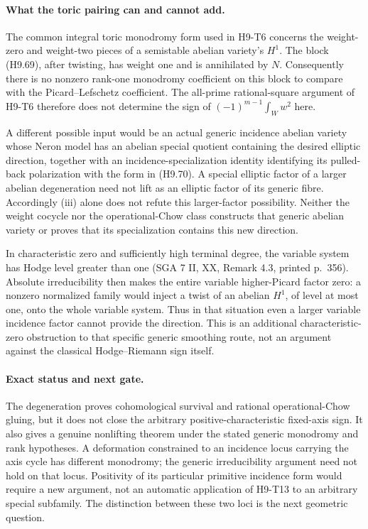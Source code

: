 \documentclass[11pt,a4paper]{article}
\begin{document}
\paragraph{What the toric pairing can and cannot add.}
The common integral toric monodromy form used in H9-T6 concerns the
weight-zero and weight-two pieces of a semistable abelian variety's
$H^1$. The block (H9.69), after twisting, has weight one and is
annihilated by $N$. Consequently there is no nonzero rank-one
monodromy coefficient on this block to compare with the
Picard--Lefschetz coefficient. The all-prime rational-square
argument of H9-T6 therefore does not determine the sign of
$(-1)^{m-1}\int_Ww^2$ here.

A different possible input would be an actual generic incidence
abelian variety whose Neron model has an abelian special quotient
containing the desired elliptic direction, together with an
incidence-specialization identity identifying its pulled-back
polarization with the form in (H9.70). A special elliptic factor of
a larger abelian degeneration need not lift as an elliptic factor
of its generic fibre. Accordingly (iii) alone does not refute this
larger-factor possibility. Neither the weight cocycle nor the
operational-Chow class constructs that generic abelian variety
or proves that its specialization contains this new direction.

In characteristic zero and sufficiently high terminal degree, the
variable system has Hodge level greater than one (SGA 7 II, XX,
Remark 4.3, printed p.~356). Absolute irreducibility then makes
the entire variable higher-Picard factor zero: a nonzero normalized
family would inject a twist of an abelian $H^1$, of level at most
one, onto the whole variable system. Thus in that situation even
a larger variable incidence factor cannot provide the direction.
This is an additional characteristic-zero obstruction to that
specific generic smoothing route, not an argument against the
classical Hodge--Riemann sign itself.

\paragraph{Exact status and next gate.}
The degeneration proves cohomological survival and rational
operational-Chow gluing, but it does not close the arbitrary
positive-characteristic fixed-axis sign. It also gives a genuine
nonlifting theorem under the stated generic monodromy and rank
hypotheses. A deformation constrained to an incidence locus
carrying the axis cycle has different monodromy; the generic
irreducibility argument need not hold on that locus. Positivity
of its particular primitive incidence form would require a new
argument, not an automatic application of H9-T13 to an arbitrary
special subfamily. The distinction between these two loci is the
next geometric question.
\end{document}
